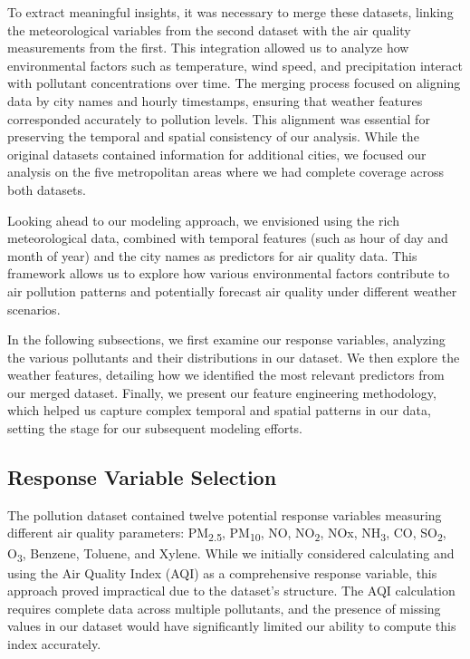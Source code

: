 \documentclass[twoside,11pt]{article}
\begin{document}
To extract meaningful insights, it was necessary to merge these datasets, linking the meteorological variables from the second dataset with the air quality measurements from the first. This integration allowed us to analyze how environmental factors such as temperature, wind speed, and precipitation interact with pollutant concentrations over time. The merging process focused on aligning data by city names and hourly timestamps, ensuring that weather features corresponded accurately to pollution levels. This alignment was essential for preserving the temporal and spatial consistency of our analysis. While the original datasets contained information for additional cities, we focused our analysis on the five metropolitan areas where we had complete coverage across both datasets.

Looking ahead to our modeling approach, we envisioned using the rich meteorological data, combined with temporal features (such as hour of day and month of year) and the city names as predictors for air quality data. This framework allows us to explore how various environmental factors contribute to air pollution patterns and potentially forecast air quality under different weather scenarios.

In the following subsections, we first examine our response variables, analyzing the various pollutants and their distributions in our dataset. We then explore the weather features, detailing how we identified the most relevant predictors from our merged dataset. Finally, we present our feature engineering methodology, which helped us capture complex temporal and spatial patterns in our data, setting the stage for our subsequent modeling efforts.


\subsection{Response Variable Selection}

The pollution dataset contained twelve potential response variables measuring different air quality parameters: PM\textsubscript{2.5}, PM\textsubscript{10}, NO, NO\textsubscript{2}, NOx, NH\textsubscript{3}, CO, SO\textsubscript{2}, O\textsubscript{3}, Benzene, Toluene, and Xylene. While we initially considered calculating and using the Air Quality Index (AQI) as a comprehensive response variable, this approach proved impractical due to the dataset's structure. The AQI calculation requires complete data across multiple pollutants, and the presence of missing values in our dataset would have significantly limited our ability to compute this index accurately.
\end{document}
